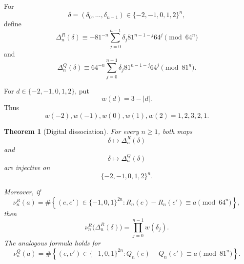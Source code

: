 \documentclass[11pt]{article}
\newtheorem{theorem}{Theorem}[section]
\theoremstyle{remark}
\begin{document}
For
\[
\delta=(\delta_0,\ldots,\delta_{n-1})
\in\{-2,-1,0,1,2\}^n,
\]
define
\[
\Delta_n^{R}(\delta)
\equiv
-81^{-n}
\sum_{j=0}^{n-1}
\delta_j81^{n-1-j}64^j
\pmod{64^n}
\]
and
\[
\Delta_n^{Q}(\delta)
\equiv
64^{-n}
\sum_{j=0}^{n-1}
\delta_j81^{n-1-j}64^j
\pmod{81^n}.
\]

For \(d\in\{-2,-1,0,1,2\}\), put
\[
w(d)=3-|d|.
\]
Thus
\[
w(-2),w(-1),w(0),w(1),w(2)
=
1,2,3,2,1.
\]

\begin{theorem}[Digital dissociation]
\label{thm:dissociation}
For every \(n\ge1\), both maps
\[
\delta\longmapsto\Delta_n^R(\delta)
\]
and
\[
\delta\longmapsto\Delta_n^Q(\delta)
\]
are injective on
\[
\{-2,-1,0,1,2\}^n.
\]

Moreover, if
\[
\nu_n^R(a)
=
\#\left\{
(e,e')\in\{-1,0,1\}^{2n}:
R_n(e)-R_n(e')\equiv a\pmod{64^n}
\right\},
\]
then
\[
\nu_n^R\bigl(\Delta_n^R(\delta)\bigr)
=
\prod_{j=0}^{n-1}w(\delta_j).
\]
The analogous formula holds for
\[
\nu_n^Q(a)
=
\#\left\{
(e,e')\in\{-1,0,1\}^{2n}:
Q_n(e)-Q_n(e')\equiv a\pmod{81^n}
\right\}.
\]
\end{theorem}
\end{document}
